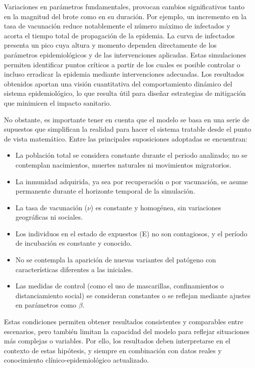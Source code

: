  Variaciones en parámetros fundamentales, provocan cambios significativos tanto en la magnitud del brote como en su duración. Por ejemplo, un incremento en la tasa de vacunación reduce notablemente el número máximo de infectados y acorta el tiempo total de propagación de la epidemia. La curva de infectados presenta un pico cuya altura y momento dependen directamente de los parámetros epidemiológicos y de las intervenciones aplicadas.
Estas simulaciones permiten identificar puntos críticos a partir de los cuales es posible controlar o incluso erradicar la epidemia mediante intervenciones adecuadas. Los resultados obtenidos aportan una visión cuantitativa del comportamiento dinámico del sistema epidemiológico, lo que resulta útil para diseñar estrategias de mitigación que minimicen el impacto sanitario.

No obstante, es importante tener en cuenta que el modelo se basa en una serie de supuestos que simplifican la realidad para hacer el sistema tratable desde el punto de vista matemático. Entre las principales suposiciones adoptadas se encuentran:

\begin{itemize}
    \item La población total se considera constante durante el periodo analizado; no se contemplan nacimientos, muertes naturales ni movimientos migratorios.
    \item La inmunidad adquirida, ya sea por recuperación o por vacunación, se asume permanente durante el horizonte temporal de la simulación.
    \item La tasa de vacunación (\(\nu\)) es constante y homogénea, sin variaciones geográficas ni sociales.
    \item Los individuos en el estado de expuestos (E) no son contagiosos, y el período de incubación es constante y conocido.
    \item No se contempla la aparición de nuevas variantes del patógeno con características diferentes a las iniciales.
    \item Las medidas de control (como el uso de mascarillas, confinamientos o distanciamiento social) se consideran constantes o se reflejan mediante ajustes en parámetros como \(\beta\).
\end{itemize}

Estas condiciones permiten obtener resultados consistentes y comparables entre escenarios, pero también limitan la capacidad del modelo para reflejar situaciones más complejas o variables. Por ello, los resultados deben interpretarse en el contexto de estas hipótesis, y siempre en combinación con datos reales y conocimiento clínico-epidemiológico actualizado.

